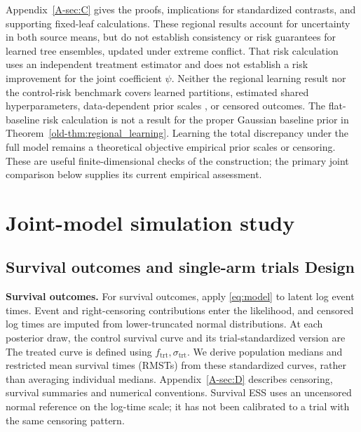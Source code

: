 \documentclass[11pt]{article}
\theoremstyle{remark}\newtheorem{remark}{Remark}[section]
\providecommand{\DIFaddtex}[1]{{\protect\color{blue} \sf #1}} %
\providecommand{\DIFdeltex}[1]{{\protect\color{red} \scriptsize #1}} %
\providecommand{\DIFaddbegin}{} %
\providecommand{\DIFaddend}{} %
\providecommand{\DIFdelbegin}{} %
\providecommand{\DIFdelend}{} %
\providecommand{\DIFadd}[1]{\texorpdfstring{\DIFaddtex{#1}}{#1}} %
\providecommand{\DIFdel}[1]{\texorpdfstring{\DIFdeltex{#1}}{}} %
\begin{document}
\DIFdel{Appendix~\ref{A-sec:C} gives the proofs, implications for standardized contrasts, and supporting fixed-leaf calculations. These regional results account for uncertainty in both source means, but do not establish consistency or risk guarantees for learned tree ensembles, updated }\DIFdelend \DIFaddbegin \DIFadd{under extreme conflict. That risk calculation uses an independent treatment estimator and does not establish a risk improvement for the joint coefficient $\psi$. Neither the regional learning result nor the control-risk benchmark covers learned partitions, estimated }\DIFaddend shared hyperparameters, \DIFdelbegin \DIFdel{data-dependent prior scales , or censored outcomes. The flat-baseline risk calculation is not a result for the proper Gaussian baseline prior in Theorem~\ref{old-thm:regional_learning}. Learning the total discrepancy under the full model remains a theoretical objective}\DIFdelend \DIFaddbegin \DIFadd{empirical prior scales or censoring. These are useful finite-dimensional checks of the construction; the primary joint comparison below supplies its current empirical assessment}\DIFaddend .

\DIFaddbegin \section{\DIFadd{Joint-model simulation study}}
\label{sec:joint_validation_main}

\DIFaddend \subsection{\DIFdelbegin \DIFdel{Survival outcomes and single-arm trials}\DIFdelend \DIFaddbegin \DIFadd{Design}\DIFaddend }
\DIFdelbegin %
\DIFdel{\textbf{Survival outcomes.}
For survival outcomes, apply \eqref{eq:model} to latent log event times. Event and right-censoring contributions enter the likelihood, and censored log times are imputed from lower-truncated normal distributions. At each posterior draw, the control survival curve and its trial-standardized version are
}%
\DIFdel{The treated curve is defined using $f_{\mathrm{trt}},\sigma_{\mathrm{trt}}$. We derive population medians and restricted mean survival times (RMSTs) from these standardized curves, rather than averaging individual medians. Appendix~\ref{A-sec:D} describes censoring, survival summaries and numerical conventions. Survival ESS uses an uncensored normal reference on the log-time scale; it has not been calibrated to a trial with the same censoring pattern.
}\DIFdelend 
\end{document}
